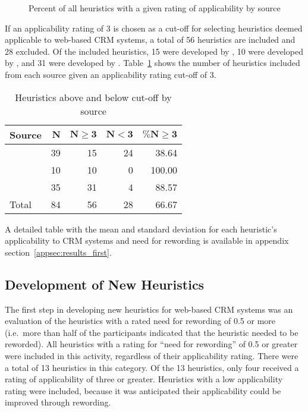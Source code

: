 \begin{figure}[htbp]
	\centering
	
	\caption{Percent of all heuristics with a given rating of applicability by source}
	\label{img:first_by_source}
\end{figure}

If an applicability rating of 3 is chosen as a cut-off for selecting heuristics deemed applicable to web-based CRM systems, a total of 56 heuristics are included and 28 excluded. Of the included heuristics, 15 were developed by \citet{Ardito2006}, 10 were developed by \citet{Nielsen1994a}, and 31 were developed by \citet{Singh2009}. Table~\ref{tab:first_results_cut-off} shows the number of heuristics included from each source given an applicability rating cut-off of 3.

\begin{table}[htbp]
	\centering
	\vspace{0.5cm}
	\caption{Heuristics above and below cut-off by source}
	\label{tab:first_results_cut-off}
	\begin{tabular}{lrrrr}	\toprule
		\textbf{Source} & $\mathbf{N}$ & $\mathbf{N \boldsymbol{\geq} 3}$ & $\mathbf{N \boldsymbol{<} 3}$ & $\mathbf{\boldsymbol{\%} N \boldsymbol{\geq} 3}$ \\ \midrule
		\citet{Ardito2006} 		& 39 & 15 & 24 	&  38.64 \\
		\citet{Nielsen1994a} 	& 10 & 10 & 0 	& 100.00 \\
		\citet{Singh2009} 		& 35 & 31 & 4 	&  88.57 \\ \midrule
		Total					& 84 & 56 & 28 	&  66.67 \\
		\bottomrule
	\end{tabular}
\end{table}

A detailed table with the mean and standard deviation for each heuristic's applicability to CRM systems and need for rewording is available in appendix section~\ref{appsec:results_first}.

\FloatBarrier
\subsection{Development of New Heuristics}
The first step in developing new heuristics for web-based CRM systems was an evaluation of the heuristics with a rated need for rewording of 0.5 or more (i.e.\ more than half of the participants indicated that the heuristic needed to be reworded). All heuristics with a rating for ``need for rewording'' of 0.5 or greater were included in this activity, regardless of their applicability rating. There were a total of 13 heuristics in this category. Of the 13 heuristics, only four received a rating of applicability of three or greater. Heuristics with a low applicability rating were included, because it was anticipated their applicability could be improved through rewording.

